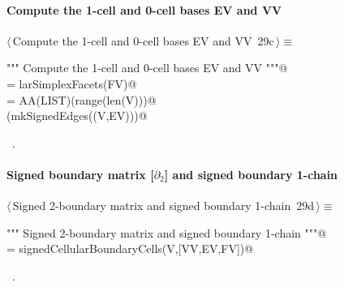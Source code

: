 \documentclass[11pt,oneside]{article}	%
\begin{document}
\paragraph{Compute the 1-cell and 0-cell bases EV and VV}
\begin{flushleft} \small \label{scrap50}
\protect{}$\langle\,$Compute the 1-cell and 0-cell bases EV and VV\nobreak\ {\footnotesize 29c}$\,\rangle\equiv$
\vspace{-1ex}
\begin{list}{}{} \item
\mbox{}\verb@""" Compute the 1-cell and 0-cell bases EV and VV """@\\
\mbox{}\verb@EV = larSimplexFacets(FV)@\\
\mbox{}\verb@VV = AA(LIST)(range(len(V)))@\\
\mbox{}\verb@VIEW(mkSignedEdges((V,EV)))@\\
\mbox{}\verb@@{\NWsep}
\end{list}
\vspace{-1ex}
\footnotesize\addtolength{\baselineskip}{-1ex}
\begin{list}{}{\setlength{\itemsep}{-\parsep}\setlength{\itemindent}{-\leftmargin}}
\item \NWtxtMacroRefIn\ .
\end{list}
\end{flushleft}

\paragraph{Signed boundary matrix [$\partial_2$] and signed boundary 1-chain}
\begin{flushleft} \small \label{scrap51}
\protect{}$\langle\,$Signed 2-boundary matrix and signed boundary 1-chain\nobreak\ {\footnotesize 29d}$\,\rangle\equiv$
\vspace{-1ex}
\begin{list}{}{} \item
\mbox{}\verb@""" Signed 2-boundary matrix  and signed boundary 1-chain """@\\
\mbox{}\verb@orientedBoundary = signedCellularBoundaryCells(V,[VV,EV,FV])@\\
\mbox{}\verb@@{\NWsep}
\end{list}
\vspace{-1ex}
\footnotesize\addtolength{\baselineskip}{-1ex}
\begin{list}{}{\setlength{\itemsep}{-\parsep}\setlength{\itemindent}{-\leftmargin}}
\item \NWtxtMacroRefIn\ .
\end{list}
\end{flushleft}
\end{document}
